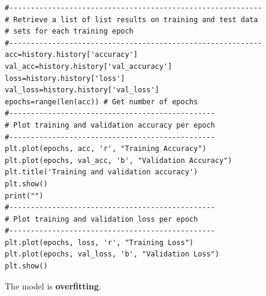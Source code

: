 \documentclass[20pt]{article}
\begin{document}
\begin{itemize}
\begin{verbatim}
#-----------------------------------------------------------
# Retrieve a list of list results on training and test data
# sets for each training epoch
#-----------------------------------------------------------
acc=history.history['accuracy']
val_acc=history.history['val_accuracy']
loss=history.history['loss']
val_loss=history.history['val_loss']
epochs=range(len(acc)) # Get number of epochs
#------------------------------------------------
# Plot training and validation accuracy per epoch
#------------------------------------------------
plt.plot(epochs, acc, 'r', "Training Accuracy")
plt.plot(epochs, val_acc, 'b', "Validation Accuracy")
plt.title('Training and validation accuracy')
plt.show()
print("")
#------------------------------------------------
# Plot training and validation loss per epoch
#------------------------------------------------
plt.plot(epochs, loss, 'r', "Training Loss")
plt.plot(epochs, val_loss, 'b', "Validation Loss")
plt.show()
		\end{verbatim}
		The model is \textbf{overfitting}.
	\end{itemize}
\end{document}
